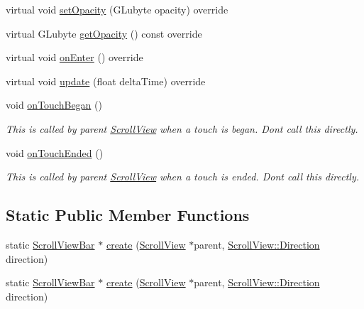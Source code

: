 \begin{DoxyCompactItemize}
virtual void \hyperlink{classui_1_1ScrollViewBar_a89da6d683d0157d90c93b559e90c69e3}{set\+Opacity} (G\+Lubyte opacity) override
\item 
virtual G\+Lubyte \hyperlink{classui_1_1ScrollViewBar_a6c36fff342601b1ab29afaed5e4e201d}{get\+Opacity} () const override
\item 
virtual void \hyperlink{classui_1_1ScrollViewBar_a7f0ab392ce00fa9dbb9db54dfbe01e4a}{on\+Enter} () override
\item 
virtual void \hyperlink{classui_1_1ScrollViewBar_a9584b184a09bc1bf24f1a8805641294b}{update} (float delta\+Time) override
\item 
\mbox{\label{classui_1_1ScrollViewBar_a140a5400e240869c9295eec8ddf7823b}} 
void \hyperlink{classui_1_1ScrollViewBar_a140a5400e240869c9295eec8ddf7823b}{on\+Touch\+Began} ()
\begin{DoxyCompactList}\small\item\em This is called by parent \hyperlink{classui_1_1ScrollView}{Scroll\+View} when a touch is began. Don\textquotesingle{}t call this directly. \end{DoxyCompactList}\item 
\mbox{\label{classui_1_1ScrollViewBar_a3aa656e9573c1995851bfe2f1a91eac8}} 
void \hyperlink{classui_1_1ScrollViewBar_a3aa656e9573c1995851bfe2f1a91eac8}{on\+Touch\+Ended} ()
\begin{DoxyCompactList}\small\item\em This is called by parent \hyperlink{classui_1_1ScrollView}{Scroll\+View} when a touch is ended. Don\textquotesingle{}t call this directly. \end{DoxyCompactList}\end{DoxyCompactItemize}
\subsection*{Static Public Member Functions}
\begin{DoxyCompactItemize}
\item 
static \hyperlink{classui_1_1ScrollViewBar}{Scroll\+View\+Bar} $\ast$ \hyperlink{classui_1_1ScrollViewBar_aabaeb14d832b49de79ab721170a284ff}{create} (\hyperlink{classui_1_1ScrollView}{Scroll\+View} $\ast$parent, \hyperlink{classui_1_1ScrollView_aed2d778ae8098dcafe323b2beae8dd6b}{Scroll\+View\+::\+Direction} direction)
\item 
static \hyperlink{classui_1_1ScrollViewBar}{Scroll\+View\+Bar} $\ast$ \hyperlink{classui_1_1ScrollViewBar_abe22494ea700072a47abad89675ce319}{create} (\hyperlink{classui_1_1ScrollView}{Scroll\+View} $\ast$parent, \hyperlink{classui_1_1ScrollView_aed2d778ae8098dcafe323b2beae8dd6b}{Scroll\+View\+::\+Direction} direction)
\end{DoxyCompactItemize}
